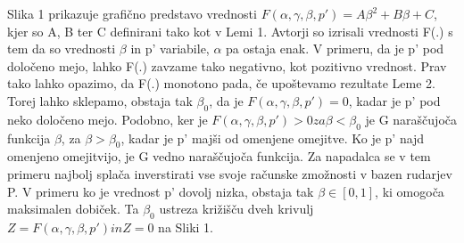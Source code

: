 \documentclass[12pt]{article}
\begin{document}
Slika 1 prikazuje grafično predstavo vrednosti $ F(\alpha, \gamma, \beta, p') = A\beta^2 + B\beta + C $, kjer so A, B ter C definirani tako kot v Lemi 1. Avtorji so izrisali vrednosti F(.) s tem da so vrednosti $\beta$ in p' variabile, $\alpha$ pa ostaja enak. V primeru, da je p' pod določeno mejo, lahko F(.) zavzame tako negativno, kot pozitivno vrednost. Prav tako lahko opazimo, da F(.) monotono pada, če upoštevamo rezultate Leme 2. Torej lahko sklepamo, obstaja tak $\beta_0$, da je $ F(\alpha, \gamma, \beta, p') = 0 $, kadar je p' pod neko določeno mejo. Podobno, ker je $ F(\alpha, \gamma, \beta, p') > 0 za \beta < \beta_0 $ je G naraščujoča funkcija $\beta$, za $\beta > \beta_0$, kadar je p' majši od omenjene omejitve. Ko je p' najd omenjeno omejitvijo, je G vedno naraščujoča funkcija. Za napadalca se v tem primeru najbolj splača inverstirati vse svoje računske zmožnosti v bazen rudarjev P. V primeru ko je vrednost p' dovolj nizka, obstaja tak $\beta \in [0, 1]$, ki omogoča maksimalen dobiček. Ta $\beta_0$ ustreza križišču dveh krivulj $Z = F(\alpha, \gamma, \beta, p') in Z = 0$ na Sliki 1. 
\newpage
\end{document}
